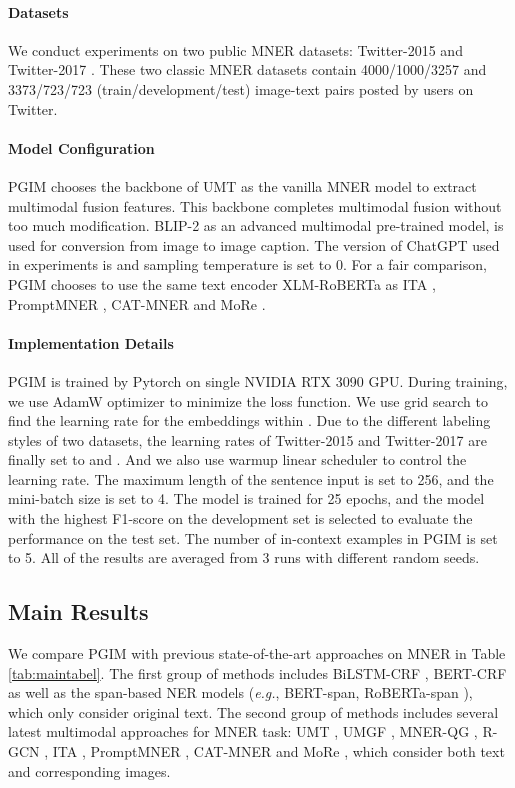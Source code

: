 \documentclass[11pt]{article}
\begin{document}
\paragraph{Datasets}
We conduct experiments on two public MNER datasets: Twitter-2015 \citep{zhang2018adaptive} and Twitter-2017 \citep{lu2018visual}.
These two classic MNER datasets contain 4000/1000/3257 and 3373/723/723 (train/development/test) image-text pairs posted by users on Twitter.

\paragraph{Model Configuration}
PGIM chooses the backbone of UMT \citep{yu2020improving} as the vanilla MNER model to extract multimodal fusion features. This backbone completes multimodal fusion without too much modification. 
BLIP-2 \citep{li2023blip} as an advanced multimodal pre-trained model, is used for conversion from image to image caption. 
The version of ChatGPT used in experiments is  and sampling temperature is set to 0. 
For a fair comparison, PGIM chooses to use the same text encoder XLM-RoBERTa \citep{conneau2019unsupervised} as ITA \citep{wang2021ita}, PromptMNER \citep{wang2022promptmner}, CAT-MNER \citep{wang2022cat} and MoRe \citep{wang2022named}.


\paragraph{Implementation Details}
PGIM is trained by Pytorch on single NVIDIA RTX 3090 GPU. During training, we use AdamW \citep{loshchilov2017decoupled} optimizer to minimize the loss function. We use grid search to find the learning rate for the embeddings within . 
Due to the different labeling styles of two datasets, the learning rates of Twitter-2015 and Twitter-2017 are finally set to  and . 
And we also use warmup linear scheduler to control the learning rate. 
The maximum length of the sentence input is set to 256, and the mini-batch size is set to 4. 
The model is trained for 25 epochs, and the model with the highest F1-score on the development set is selected to evaluate the performance on the test set. The number of in-context examples  in PGIM is set to 5. All of the results are averaged from 3 runs with different random seeds.

\subsection{Main Results}
\label{MainResults}
We compare PGIM with previous state-of-the-art approaches on MNER in Table \ref{tab:maintabel}. The first group of methods includes BiLSTM-CRF \citep{huang2015bidirectional},
BERT-CRF \citep{devlin2018bert} as well as the span-based NER models (\emph{e.g.}, BERT-span, RoBERTa-span \citep{yamada2020luke}), which only consider original text. The second group of methods includes several latest multimodal approaches for MNER task: UMT \citep{yu2020improving}, UMGF \citep{zhang2021multi}, MNER-QG \citep{jia2022mner}, R-GCN \citep{zhao2022learning}, ITA \citep{wang2021ita}, PromptMNER \citep{wang2022promptmner}, CAT-MNER \citep{wang2022cat} and MoRe \citep{wang2022named}, which consider both text and corresponding images. 
\end{document}
